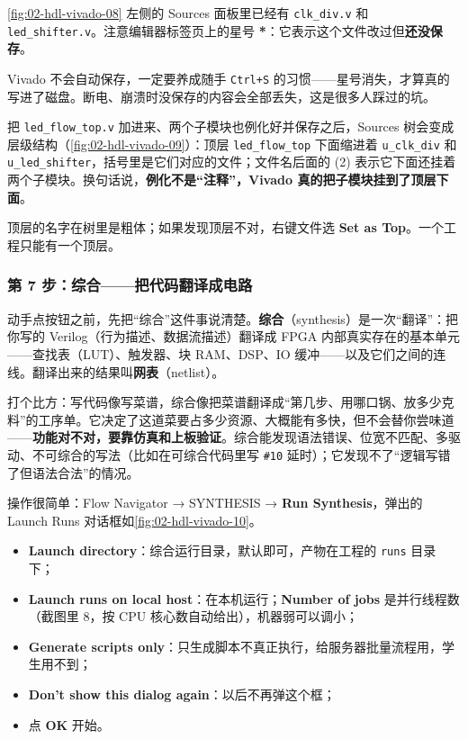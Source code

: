 \cref{fig:02-hdl-vivado-08} 左侧的 Sources 面板里已经有 \texttt{clk\_div.v} 和 \texttt{led\_shifter.v}。注意编辑器标签页上的星号 \textbf{*}：它表示这个文件改过但\textbf{还没保存}。


Vivado 不会自动保存，一定要养成随手 \texttt{Ctrl+S} 的习惯——星号消失，才算真的写进了磁盘。断电、崩溃时没保存的内容会全部丢失，这是很多人踩过的坑。

把 \texttt{led\_flow\_top.v} 加进来、两个子模块也例化好并保存之后，Sources 树会变成层级结构（\cref{fig:02-hdl-vivado-09}）：顶层 \texttt{led\_flow\_top} 下面缩进着 \texttt{u\_clk\_div} 和 \texttt{u\_led\_shifter}，括号里是它们对应的文件；文件名后面的 (2) 表示它下面还挂着两个子模块。换句话说，\textbf{例化不是“注释”，Vivado 真的把子模块挂到了顶层下面}。


顶层的名字在树里是粗体；如果发现顶层不对，右键文件选 \textbf{Set as Top}。一个工程只能有一个顶层。

\subsubsection*{第 7 步：综合——把代码翻译成电路}

动手点按钮之前，先把“综合”这件事说清楚。\textbf{综合}（synthesis）是一次“翻译”：把你写的 Verilog（行为描述、数据流描述）翻译成 FPGA 内部真实存在的基本单元——查找表（LUT）、触发器、块 RAM、DSP、IO 缓冲——以及它们之间的连线。翻译出来的结果叫\textbf{网表}（netlist）。

打个比方：写代码像写菜谱，综合像把菜谱翻译成“第几步、用哪口锅、放多少克料”的工序单。它决定了这道菜要占多少资源、大概能有多快，但不会替你尝味道——\textbf{功能对不对，要靠仿真和上板验证}。综合能发现语法错误、位宽不匹配、多驱动、不可综合的写法（比如在可综合代码里写 \texttt{\#10} 延时）；它发现不了“逻辑写错了但语法合法”的情况。

操作很简单：Flow Navigator → SYNTHESIS → \textbf{Run Synthesis}，弹出的 Launch Runs 对话框如\cref{fig:02-hdl-vivado-10}。


\begin{itemize}
  \item \textbf{Launch directory}：综合运行目录，默认即可，产物在工程的 \texttt{runs} 目录下；
  \item \textbf{Launch runs on local host}：在本机运行；\textbf{Number of jobs} 是并行线程数（截图里 8，按 CPU 核心数自动给出），机器弱可以调小；
  \item \textbf{Generate scripts only}：只生成脚本不真正执行，给服务器批量流程用，学生用不到；
  \item \textbf{Don't show this dialog again}：以后不再弹这个框；
  \item 点 \textbf{OK} 开始。
\end{itemize}

